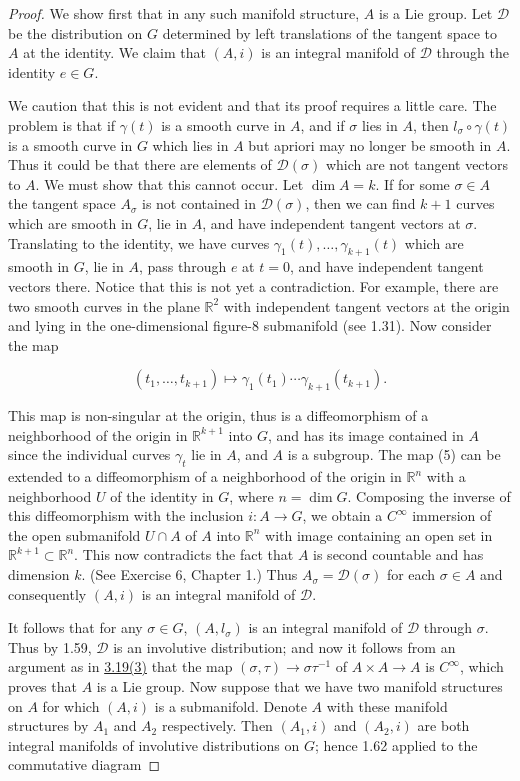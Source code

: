 \begin{proof}
We show first that in any such manifold structure, $A$ is a Lie group. Let $\mathcal{D}$ be the distribution on $G$ determined by left translations of the tangent space to $A$ at the identity. We claim that $(A,i)$ is an integral manifold of $\mathcal{D}$ through the identity $e\in G$.

We caution that this is not evident and that its proof requires a little care. The problem is that if $\gamma(t)$ is a smooth curve in $A$, and if $\sigma$ lies in $A$, then $l_{\sigma}\circ\gamma(t)$ is a smooth curve in $G$ which lies in $A$ but apriori may no longer be smooth in $A$. Thus it could be that there are elements of $\mathcal{D}(\sigma)$ which are not tangent vectors to $A$. We must show that this cannot occur. Let $\dim A = k$. If for some $\sigma \in A$ the tangent space $A_{\sigma}$ is not contained in $\mathcal{D}(\sigma)$, then we can find $k + 1$ curves which are smooth in $G$, lie in $A$, and have independent tangent vectors at $\sigma$. Translating to the identity, we have curves $\gamma_{1}(t), \ldots, \gamma_{k+1}(t)$ which are smooth in $G$, lie in $A$, pass through $e$ at $t = 0$, and have independent tangent vectors there. Notice that this is not yet a contradiction. For example, there are two smooth curves in the plane $\mathbb{R}^{2}$ with independent tangent vectors at the origin and lying in the one-dimensional figure-8 submanifold (see 1.31). Now consider the map

\[
(t_{1},\ldots,t_{k+1})\mapsto\gamma_{1}(t_{1})\cdots\gamma_{k+1}(t_{k+1}).
\]

This map is non-singular at the origin, thus is a diffeomorphism of a neighborhood of the origin in $\mathbb{R}^{k+1}$ into $G$, and has its image contained in $A$ since the individual curves $\gamma_t$ lie in $A$, and $A$ is a subgroup. The map (5) can be extended to a diffeomorphism of a neighborhood of the origin in $\mathbb{R}^n$ with a neighborhood $U$ of the identity in $G$, where $n = \dim G$. Composing the inverse of this diffeomorphism with the inclusion $i: A \to G$, we obtain a $C^\infty$ immersion of the open submanifold $U \cap A$ of $A$ into $\mathbb{R}^n$ with image containing an open set in $\mathbb{R}^{k+1} \subset \mathbb{R}^n$. This now contradicts the fact that $A$ is second countable and has dimension $k$. (See Exercise 6, Chapter 1.) Thus $A_\sigma = \mathcal{D}(\sigma)$ for each $\sigma \in A$ and consequently $(A, i)$ is an integral manifold of $\mathcal{D}$.

It follows that for any $\sigma\in G$, $(A,l_{\sigma})$ is an integral manifold of $\mathcal{D}$ through $\sigma$. Thus by 1.59, $\mathcal{D}$ is an involutive distribution; and now it follows from an argument as in \hyperref[thm:3.19]{3.19(3)} that the map $(\sigma,\tau)\to\sigma\tau^{-1}$ of $A\times A\to A$ is $C^{\infty}$, which proves that $A$ is a Lie group. Now suppose that we have two manifold structures on $A$ for which $(A,i)$ is a submanifold. Denote $A$ with these manifold structures by $A_{1}$ and $A_{2}$ respectively. Then $(A_{1},i)$ and $(A_{2},i)$ are both integral manifolds of involutive distributions on $G$; hence 1.62 applied to the commutative diagram


\end{proof}
